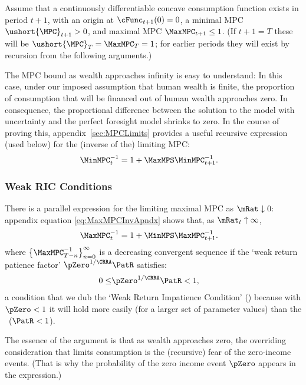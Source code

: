 \documentclass[BufferStockTheory]{subfiles}
\begin{document}
\newcommand{\NewMaxMinMPC}{\ushort{\MPC}}

Assume that a continuously differentiable concave consumption function exists in period $t+1$, with an origin at
$\cFunc_{t+1}(0)=0$, a minimal MPC $\NewMaxMinMPC_{t+1}>0$, and
maximal MPC $\MaxMPC_{t+1} \leq 1$.  (If $t+1 = T$ these will be
$\NewMaxMinMPC_{T}=\MaxMPC_{T}=1$; for earlier periods they will exist
by recursion from the following arguments.)

The MPC bound as wealth approaches infinity is easy to understand: In this case, under our imposed assumption that human wealth is finite, the proportion of consumption that will be financed out of human wealth approaches zero. In consequence, the proportional difference between the solution to the model with uncertainty and the perfect foresight model shrinks to zero.  \hypertarget{MPCnvrsLower}{}
In the course of proving this, appendix~\ref{sec:MPCLimits} provides a useful recursive expression (used below) for the (inverse of the) limiting MPC: \hypertarget{WRICCond}{}
\begin{align}
  \MinMPC_{t}^{-1}  & = 1+\MaxMPS \MinMPC_{t+1}^{-1} \label{eq:MinMPCInv}.
\end{align}

\subsubsection{Weak RIC Conditions}{}\label{sec:WRIC}
\hypertarget{MPCnvrsUpper}{}
\hypertarget{WRIC}{}
There is a parallel expression for the limiting maximal 
MPC as $\mRat \downarrow 0$: appendix equation \eqref{eq:MaxMPCInvApndx}  shows that, as $\mRat_{t} \uparrow \infty$,
\begin{align}
  \MaxMPC_{t}^{-1}  & = 1+\MinMPS \MaxMPC_{t+1}^{-1} \label{eq:MaxMPCInv}.
\end{align}
\hypertarget{WRPF}{}  
where $\left\{\MaxMPC_{T-n}^{-1}\right\} _{n=0}^{\infty}$ is a decreasing %
convergent sequence if the `weak return patience factor' $\pZero^{1/\CRRA}\PatR$ satisfies:
\begin{align}
  0 \leq & \pZero^{1/\CRRA} \PatR < 1 \label{eq:WRIC},
\end{align}
a condition that we dub the `Weak Return Impatience Condition' (\WRIC)
because with $\pZero < 1$ it will hold more easily (for a larger set of parameter
values) than the \RIC~($\PatR < 1$).

The essence of the argument is that as wealth approaches zero, the overriding
consideration that limits consumption is the (recursive) fear of the zero-income events.  (That is why the probability of the zero
income event $\pZero$ appears in the expression.)  
\end{document}
